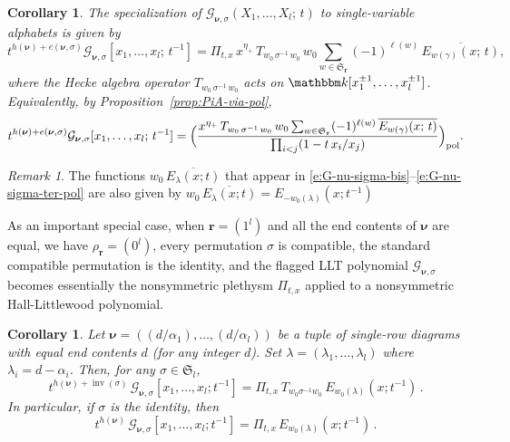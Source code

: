 \documentclass[12pt]{amsart}
\newtheorem{cor}[thm]{Corollary}
\theoremstyle{definition}
\theoremstyle{remark}
\newtheorem{remark}[thm]{Remark}
\newcommand{\kk}{{\mathbbm k}}
\newcommand{\rr}{{\mathbf r}}
\newcommand{\nubold}{{\boldsymbol \nu }}
\newcommand{\Sfrak}{{\mathfrak S}}
\newcommand{\Gcal}{{\mathcal G}}
\DeclareMathOperator{\inv}{inv}
\DeclareMathOperator{\pol}{pol}
\begin{document}
\begin{cor}\label{cor:G-nu-sigma-ter}
The specialization of $\Gcal _{\nubold ,\sigma}(X_{1},\ldots,X_{l};\,
t)$ to single-variable alphabets is given by
\begin{equation}\label{e:G-nu-sigma-ter}
t^{h(\nubold ) + e (\nubold ,\sigma )} \Gcal _{\nubold ,
\sigma}[x_{1},\ldots,x_{l};\, t^{-1}] = \Pi _{t,x}\, x^{\eta _{+}}\,
T_{w_{0}\, \sigma ^{-1} \, w_{0}}\, w_{0} \sum _{w\in \Sfrak _{\rr }}
(-1)^{\ell (w)} \, \overline{E_{w(\gamma )}(x;\, t)},
\end{equation}
where the Hecke algebra operator $T_{w_{0}\, \sigma ^{-1} \, w_{0}} $
acts on $\kk [x_{1}^{\pm 1},\ldots, x_{l}^{\pm 1}]$.  Equivalently, by
Proposition~\ref{prop:PiA-via-pol},
\begin{equation}\label{e:G-nu-sigma-ter-pol}
t^{h(\nubold ) + e (\nubold ,\sigma )} \Gcal _{\nubold ,
\sigma}[x_{1},\ldots,x_{l};\, t^{-1}] = \Bigl( \frac{x^{\eta _{+}}\,
T_{w_{0}\, \sigma ^{-1} \, w_{0}}\, w_{0} \sum _{w\in \Sfrak _{\rr }}
(-1)^{\ell (w)} \, \overline{E_{w(\gamma )}(x;\, t)}}{\prod _{i<j} (1-
t\, x_{i} / x_{j})} \Bigr)_{\pol }.
\end{equation}
\end{cor}
\begin{remark}\label{rem:flip-E}
The functions $w_{0}\, \overline{E_{\lambda }(x;t)} $ that appear in
\eqref{e:G-nu-sigma-bis}--\eqref{e:G-nu-sigma-ter-pol} are also given
by $w_{0}\, \overline{E_{\lambda }(x;t)} = E_{-w_{0}(\lambda )}(x;
t^{-1})$
\end{remark}

As an important special case, when \(\rr=(1^l)\) and all the end
contents of \(\nubold\) are equal, we have \(\rho_\rr = (0^l)\), every
permutation $\sigma$ is compatible, the standard compatible
permutation is the identity, and the flagged LLT polynomial $\Gcal
_{\nubold, \sigma}$ becomes essentially the nonsymmetric plethysm
$\Pi _{t,x}$ applied to a nonsymmetric Hall-Littlewood polynomial.

\begin{cor}\label{cor:single-rows-G}
Let \(\nubold =
((d/\alpha_1),\ldots,(d/\alpha_l))\) be a tuple of single-row diagrams
with equal end contents $d$ (for any integer $d$).  Set
\(\lambda = (\lambda_1,\ldots,\lambda_l)\) where \(\lambda_i = d -
\alpha_i\).  Then, for any \(\sigma \in \Sfrak_l\),
\begin{equation}\label{e:general-rows-G}
t^{h(\nubold)+\inv(\sigma)}\, \Gcal_{\nubold,
\sigma}[x_1,\ldots,x_l;t^{-1}] = \Pi_{t,x} \, T_{w_0 \sigma^{-1}
w_0}\, E_{w_0(\lambda)}(x;t^{-1}) \,.
\end{equation}
In particular, if $\sigma $ is the identity, then
\begin{equation}\label{e:rows-G}
t^{h(\nubold)}\, \Gcal_{\nubold, \sigma}[x_1,\ldots,x_l;t^{-1}] =
\Pi_{t,x}\, E_{w_0(\lambda)}(x;t^{-1}) \,.
\end{equation}
\end{cor}
\end{document}
